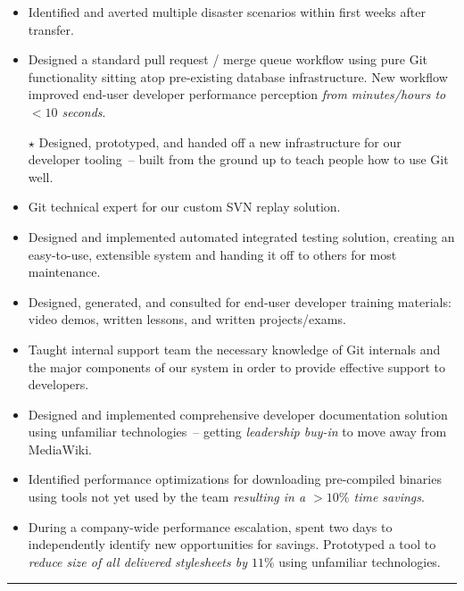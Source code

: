 \begin{position}
\begin{itemize}
  \def\importantpoint{{\large$\star$\hspace*{-1pt}}}
\item Identified and averted multiple disaster scenarios within first
  weeks after transfer.
%
%
%
\item Designed a standard pull request / merge queue workflow using
  pure Git functionality sitting atop pre-existing database
  infrastructure. New workflow improved end-user developer performance
  perception \emph{from minutes\slash hours to $<10$ seconds}.
\item[\importantpoint] Designed, prototyped, and handed off a new
  infrastructure for our developer tooling~-- built from the ground up
  to teach people how to use Git well.
\item Git technical expert for our custom SVN replay solution.
\item Designed and implemented automated integrated testing solution,
  creating an easy-to-use, extensible system and handing it off to
  others for most maintenance.
\item Designed, generated, and consulted for end-user developer
  training materials: video demos, written lessons, and written
  projects/exams.
\item Taught internal support team the necessary knowledge of Git
  internals and the major components of our system in order to provide
  effective support to developers.
\item Designed and implemented comprehensive developer documentation
  solution using unfamiliar technologies~-- getting \emph{leadership
    buy-in} to move away from MediaWiki.
\item Identified performance optimizations for downloading
  pre-compiled binaries using tools not yet used by the team
  \emph{resulting in a $>10\%$ time savings}.
\item During a company-wide performance escalation, spent two days to
  independently identify new opportunities for savings. Prototyped a
  tool to \emph{reduce size of all delivered stylesheets by $11\%$}
  using unfamiliar technologies.
\end{itemize}

\medskip
\hrule
\medskip


\end{position}
